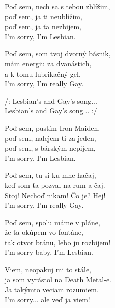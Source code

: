 
\ve{}
Poď sem, nech sa s tebou zblížim,\\
poď sem, ja ti neublížim,\\
poď sem, ja ťa nezbijem,\\
I'm sorry, I'm Lesbian. 

Poď sem, som tvoj dvorný básnik,\\
mám energiu za dvanástich,\\
a k tomu lubrikačný gel,\\
I'm sorry, I'm really Gay. 

\cho{}
/: Lesbian's and Gay's song...\\
Lesbian's and Gay's song... :/

\ve{}
Poď sem, pustím Iron Maiden,\\
poď sem, nalejem ti za jeden,\\
poď sem, s bárským nepijem,\\
I'm sorry, I'm Lesbian. 

Poď sem, tu si ku mne hačaj,\\
keď som ťa pozval na rum a čaj.\\
Stoj! Nechoď nikam! Čo je? Hej!\\
I'm sorry, I'm really Gay. 

\cho{}

\ve{}
Poď sem, spolu máme v pláne,\\
že ťa okúpem vo fontáne,\\
tak otvor bránu, lebo ju rozbijem!\\
I'm sorry baby, I'm Lesbian. 

Viem, neopakuj mi to stále,\\
ja som vyrástol na Death Metal-e.\\
Ja takýmto veciam rozumiem.\\
I'm sorry... ale veď ja viem!

\cho{}

\esong
